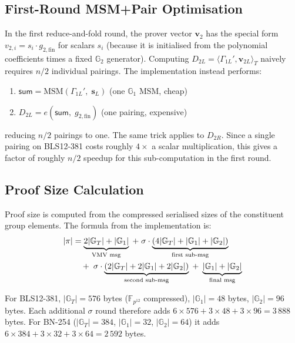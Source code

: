 \subsection{First-Round MSM+Pair Optimisation}

In the first reduce-and-fold round, the prover vector $\mathbf{v}_2$ has the
special form $v_{2,i} = s_i \cdot g_{2,\mathrm{fin}}$ for scalars $s_i$
(because it is initialised from the polynomial coefficients times a fixed
$\mathbb{G}_2$ generator). Computing $D_{2L} = \langle \Gamma_{1L}',
\mathbf{v}_{2L}\rangle_T$ naively requires $n/2$ individual pairings. The
implementation instead performs:
\begin{enumerate}
    \item $\mathsf{sum} = \mathrm{MSM}(\Gamma_{1L}',\; \mathbf{s}_L)$ \quad
          (one $\mathbb{G}_1$ MSM, cheap)
    \item $D_{2L} = e(\mathsf{sum},\; g_{2,\mathrm{fin}})$ \quad
          (one pairing, expensive)
\end{enumerate}
reducing $n/2$ pairings to one. The same trick applies to $D_{2R}$. Since a
single pairing on BLS12-381 costs roughly $4\times$ a scalar multiplication,
this gives a factor of roughly $n/2$ speedup for this sub-computation in the
first round.

\subsection{Proof Size Calculation}

Proof size is computed from the compressed serialised sizes of the constituent
group elements. The formula from the implementation is:
\begin{align}
    |\pi| &= \underbrace{2|\mathbb{G}_T| + |\mathbb{G}_1|}_{\text{VMV msg}}
    \;+\;
    \sigma\cdot\underbrace{(4|\mathbb{G}_T| + |\mathbb{G}_1| + |\mathbb{G}_2|)}_{\text{first sub-msg}}
    \notag\\
    &\quad+\;
    \sigma\cdot\underbrace{(2|\mathbb{G}_T| + 2|\mathbb{G}_1| + 2|\mathbb{G}_2|)}_{\text{second sub-msg}}
    \;+\;
    \underbrace{|\mathbb{G}_1| + |\mathbb{G}_2|}_{\text{final msg}}
\end{align}

For BLS12-381, $|\mathbb{G}_T| = 576$ bytes ($\mathbb{F}_{p^{12}}$
compressed), $|\mathbb{G}_1| = 48$ bytes, $|\mathbb{G}_2| = 96$ bytes. Each
additional $\sigma$ round therefore adds
$6\times576 + 3\times48 + 3\times96 = 3\,888$ bytes. For BN-254
($|\mathbb{G}_T| = 384$, $|\mathbb{G}_1| = 32$, $|\mathbb{G}_2| = 64$) it
adds $6\times384 + 3\times32 + 3\times64 = 2\,592$ bytes.

